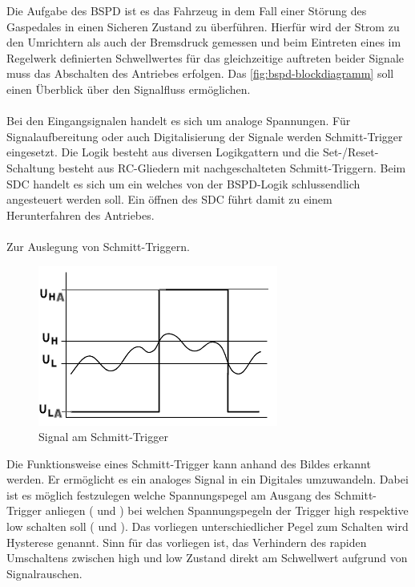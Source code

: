 Die Aufgabe des \ac{BSPD} ist es das Fahrzeug in dem Fall einer Störung des Gaspedales in einen Sicheren Zustand zu überführen. Hierfür wird der Strom zu den Umrichtern als auch der Bremsdruck gemessen und beim Eintreten eines im Regelwerk definierten Schwellwertes für das gleichzeitige auftreten beider Signale muss das Abschalten des Antriebes erfolgen. Das \ref{fig:bspd-blockdiagramm} soll einen Überblick über den Signalfluss ermöglichen.
\\
\\
Bei den Eingangsignalen handelt es sich um analoge Spannungen. Für Signalaufbereitung oder auch Digitalisierung der Signale werden Schmitt-Trigger eingesetzt. Die Logik besteht aus diversen Logikgattern und die Set-/Reset-Schaltung besteht aus RC-Gliedern mit nachgeschalteten Schmitt-Triggern. Beim \ac{SDC} handelt es sich um ein  welches von der \ac{BSPD}-Logik schlussendlich angesteuert werden soll. Ein öffnen des \ac{SDC} führt damit zu einem Herunterfahren des Antriebes.
\\
\\
Zur Auslegung von Schmitt-Triggern.
\begin{figure}
	\centering
	\includegraphics[width=0.5\linewidth]{bilder/Schmitt-trigger-diagramm.png}
	\caption{Signal am Schmitt-Trigger}
	\label{fig:schmitt-trigger-diagramm}
\end{figure}

Die Funktionsweise eines Schmitt-Trigger kann anhand des Bildes erkannt werden. Er ermöglicht es ein analoges Signal in ein Digitales umzuwandeln. Dabei ist es möglich festzulegen welche Spannungspegel am Ausgang des Schmitt-Trigger anliegen ( und ) bei welchen Spannungspegeln der Trigger high respektive low schalten soll ( und ). Das vorliegen unterschiedlicher Pegel zum Schalten wird Hysterese genannt. Sinn für das vorliegen ist, das Verhindern des rapiden Umschaltens zwischen high und low Zustand direkt am Schwellwert aufgrund von Signalrauschen.

